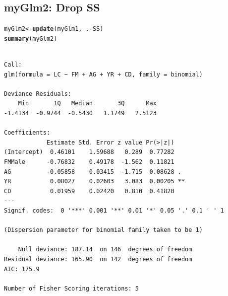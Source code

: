 \documentclass[oneside]{book}\usepackage[]{graphicx}\usepackage[svgnames]{xcolor}
\makeatletter
\newcommand{\hlopt}[1]{\textcolor[rgb]{0,0,0}{#1}}%
\newcommand{\hlstd}[1]{\textcolor[rgb]{0.345,0.345,0.345}{#1}}%
\newcommand{\hlkwb}[1]{\textcolor[rgb]{0.69,0.353,0.396}{#1}}%
\newcommand{\hlkwd}[1]{\textcolor[rgb]{0.737,0.353,0.396}{\textbf{#1}}}%
\newenvironment{kframe}{%
 \def\at@end@of@kframe{}%
 \ifinner\ifhmode%
  \def\at@end@of@kframe{\end{minipage}}%
  \begin{minipage}{\columnwidth}%
 \fi\fi%
 \def\FrameCommand##1{\hskip\@totalleftmargin \hskip-\fboxsep
 \colorbox{shadecolor}{##1}\hskip-\fboxsep
     \hskip-\linewidth \hskip-\@totalleftmargin \hskip\columnwidth}%
 \MakeFramed {\advance\hsize-\width
   \@totalleftmargin\z@ \linewidth\hsize
   \@setminipage}}%
 {\par\unskip\endMakeFramed%
 \at@end@of@kframe}
\newenvironment{knitrout}{}{} %
\makeatother
\begin{document}
\subsection*{myGlm2: Drop SS}
\begin{knitrout}
\color{fgcolor}\begin{kframe}
\begin{alltt}
\hlstd{myGlm2} \hlkwb{<-} \hlkwd{update}\hlstd{(myGlm1,} \hlopt{~}\hlstd{.} \hlopt{-} \hlstd{SS)}
\hlkwd{summary}\hlstd{(myGlm2)}
\end{alltt}
\begin{verbatim}

Call:
glm(formula = LC ~ FM + AG + YR + CD, family = binomial)

Deviance Residuals: 
    Min       1Q   Median       3Q      Max  
-1.4134  -0.9744  -0.5430   1.1749   2.5123  

Coefficients:
            Estimate Std. Error z value Pr(>|z|)   
(Intercept)  0.46101    1.59688   0.289  0.77282   
FMMale      -0.76832    0.49178  -1.562  0.11821   
AG          -0.05858    0.03415  -1.715  0.08628 . 
YR           0.08027    0.02603   3.083  0.00205 **
CD           0.01959    0.02420   0.810  0.41820   
---
Signif. codes:  0 '***' 0.001 '**' 0.01 '*' 0.05 '.' 0.1 ' ' 1

(Dispersion parameter for binomial family taken to be 1)

    Null deviance: 187.14  on 146  degrees of freedom
Residual deviance: 165.90  on 142  degrees of freedom
AIC: 175.9

Number of Fisher Scoring iterations: 5
\end{verbatim}
\end{kframe}
\end{knitrout}
\end{document}
